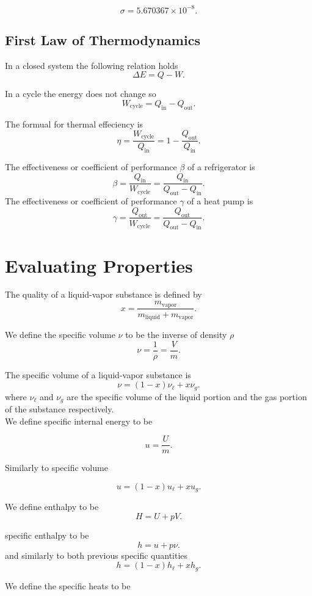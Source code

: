 \documentclass{report}
\begin{document}
\[
	\sigma = 5.670367 \times 10^{−8}
	.\]

\section{First Law of Thermodynamics}

In a closed system the following relation holds
\[
	\Delta E = Q - W
	.\]

In a cycle the energy does not change so
\[
	W_\text{cycle} = Q_\text{in} - Q_\text{out}
	.\]

The formual for thermal effeciency is
\[
	\eta = \frac{W_\text{cycle}}{Q_\text{in}} = 1-\frac{Q_\text{out}}{Q_\text{in}}
	.\]

The effectiveness or coefficient of performance $\beta$ of a refrigerator is
\[
	\beta = \frac{Q_\text{in}}{W_\text{cycle}} = \frac{Q_\text{in}}{Q_\text{out} - Q_\text{in}}
	.\]
The effectiveness or coefficient of performance $\gamma$ of a heat pump is
\[
	\gamma = \frac{Q_\text{out}}{W_\text{cycle}} = \frac{Q_\text{out}}{Q_\text{out} - Q_\text{in}}
	.\]

\chapter{Evaluating Properties} %

The quality of a liquid-vapor substance is defined by
\[
	x=\frac{m_\text{vapor}}{m_\text{liquid} + m_\text{vapor}}
	.\]

We define the specific volume $\nu$ to be the inverse of density $\rho$
\[
	\nu = \frac{1}{\rho}=\frac{V}{m}
	.\]

The specific volume of a liquid-vapor substance is
\[
	\nu = (1-x)\nu_\ell + x\nu_g
	.\]
where $\nu_\ell$ and $\nu_g$ are the specific volume of the liquid portion and the gas portion of the substance respectively.\\

We define specific internal energy to be

\[
	u = \frac{U}{m}
	.\]

Similarly to specific volume

\[
	u = (1-x)u_\ell + xu_g
	.\]

We define enthalpy to be
\[
	H=U+pV
	.\]

specific enthalpy to be
\[
	h=u+p\nu
	.\]
and similarly to both previous specific quantities
\[
	h = (1-x)h_\ell + xh_g
	.\]


We define the specific heats to be
\end{document}
